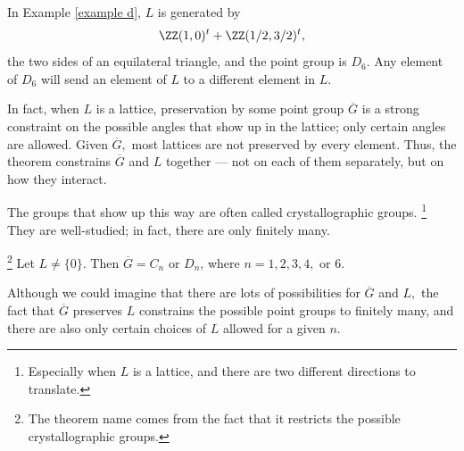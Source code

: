 In Example \ref{example d}, $L$ is generated by 
\[
\ZZ(1, 0)^t + \ZZ(1/2, 3/2)^t,
\]
the two sides of an equilateral triangle, and the point group is $D_6.$ Any element of $D_6$ will send an element of $L$ to a different element in $L.$

In fact, when $L$ is a lattice, preservation by some point group $\overline{G}$ is a strong constraint on the possible angles that show up in the lattice; only certain angles are allowed. Given $\overline{G},$ most lattices are not preserved by every element. Thus, the theorem constrains $\overline{G}$ and $L$ together --- not on each of them separately, but on how they interact. 

The groups that show up this way are often called crystallographic groups. \footnote{Especially when $L$ is a lattice, and there are two different directions to translate.} They are well-studied; in fact, there are only finitely many.


\begin{theorem}\footnote{The theorem name comes from the fact that it restricts the possible crystallographic groups.}
Let $L \neq \{0\}.$ Then $\overline{G} = C_n$ or $D_n$, where $n = 1, 2, 3, 4,$ or $6.$
\end{theorem}


Although we could imagine that there are lots of possibilities for $\overline{G}$ and $L,$ the fact that $\overline{G}$ preserves $L$ constrains the possible point groups to finitely many, and there are also only certain choices of $L$ allowed for a given $n.$


